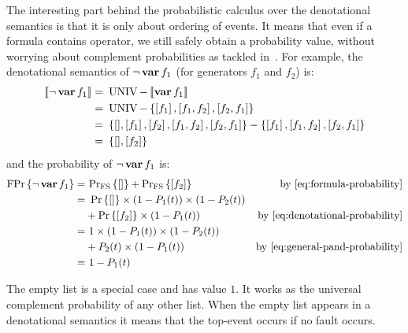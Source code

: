 The interesting part behind the probabilistic calculus over the denotational semantics is that it is only about ordering of events.
It means that even if a formula contains  operator, we still safely obtain a probability value, without worrying about complement probabilities as tackled in~\cite{Andrews2001}.
For example, the denotational semantics of $\lnot \operatorname{\mathbf{var}} f_1$ (for generators $f_1$ and $f_2$) is:
%
\begin{align}
\left[\!\left[\lnot \operatorname{\mathbf{var}} f_1\right]\!\right] = &~ \operatorname{UNIV} - \left[\!\left[\operatorname{\mathbf{var}} f_1\right]\!\right] \nonumber\\
= &~ \operatorname{UNIV} - 
	\left\{
		\left[ f_1 \right],
		\left[ f_1,f_2 \right],
		\left[ f_2,f_1 \right]
	\right\}\nonumber\\
= &~ \left\{ 
		[],
		\left[ f_1 \right],
		\left[ f_2 \right],
		\left[ f_1,f_2 \right],
		\left[ f_2,f_1 \right]
	\right\} - 
	\left\{
	\left[ f_1 \right],
	\left[ f_1,f_2 \right],
	\left[ f_2,f_1 \right]
	\right\}
	\nonumber\\
= &~ \left\{[], \left[ f_2 \right] \right\}
\end{align}
%
and the probability of $\lnot \operatorname{\mathbf{var}} f_1$ is:
%
\begin{align}
\formulaprob{\lnot \var{f_1}} = &~ \denotationalprob{\left[\right]} + \denotationalprob{\left[f_2\right]} & \text{by \cref{eq:formula-probability}} \nonumber\\
= &~ \probability{\left[\right]}\times\left(1 - P_1(t)\right)\times\left(1 - P_2(t)\right)\nonumber\\
& + \probability{\left[f_2\right]}\times\left(1 - P_1(t)\right) & \text{by \cref{eq:denotational-probability}} \nonumber\\
= &~ 1 \times \left(1- P_1(t)\right) \times \left(1 - P_2(t)\right)\nonumber\\
& + P_2(t) \times \left(1 - P_1(t)\right) & \text{by \cref{eq:general-pand-probability}}\nonumber\\
= &~ 1 - P_1(t)
\end{align}

The empty list is a special case and has value $1$.
It works as the universal complement probability of any other list.
When the empty list appears in a denotational semantics it means that the top-event occurs if no fault occurs.

